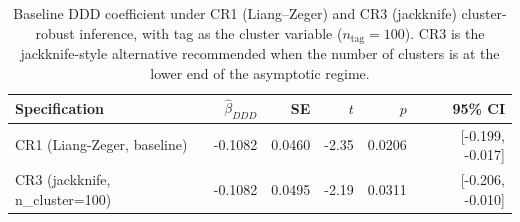 \begin{table}[ht]
\centering
\caption{Baseline DDD coefficient under CR1 (Liang--Zeger) and CR3 (jackknife) cluster-robust inference, with tag as the cluster variable ($n_{\text{tag}} = 100$). CR3 is the jackknife-style alternative recommended when the number of clusters is at the lower end of the asymptotic regime.}
\label{tab:cr3_baseline}
\small
\begin{tabular}{lrrrrr}
\toprule
Specification & $\hat\beta_{DDD}$ & SE & $t$ & $p$ & 95\% CI \\
\midrule
CR1 (Liang-Zeger, baseline) & -0.1082 & 0.0460 & -2.35 & 0.0206 & [-0.199, -0.017] \\
CR3 (jackknife, n_cluster=100) & -0.1082 & 0.0495 & -2.19 & 0.0311 & [-0.206, -0.010] \\
\bottomrule
\end{tabular}
\end{table}